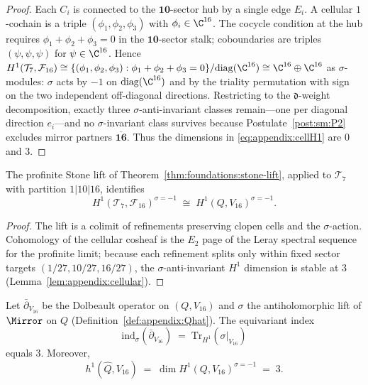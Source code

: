 \begin{proof}
Each $C_i$ is connected to the $\mathbf{10}$-sector hub by a single edge
$E_i$. A cellular $1$-cochain is a triple $(\phi_1,\phi_2,\phi_3)$ with
$\phi_i\in\C^{16}$. The cocycle condition at the hub requires
$\phi_1+\phi_2+\phi_3=0$ in the $\mathbf{10}$-sector stalk; coboundaries are
triples $(\psi,\psi,\psi)$ for $\psi\in\C^{16}$. Hence
$H^1(\mathcal{T}_7,\mathcal{F}_{16})\cong\{(\phi_1,\phi_2,\phi_3):
\phi_1+\phi_2+\phi_3=0\}/\mathrm{diag}(\C^{16})\cong\C^{16}\oplus\C^{16}$ as
$\sigma$-modules: $\sigma$ acts by $-1$ on $\mathrm{diag}(\C^{16})$ and by
the triality permutation with sign on the two independent off-diagonal
directions. Restricting to the $\mathfrak{d}$-weight decomposition, exactly
three $\sigma$-anti-invariant classes remain---one per diagonal direction
$e_i$---and no $\sigma$-invariant class survives because Postulate~\ref{post:sm:P2}
excludes mirror partners $\overline{\mathbf{16}}$. Thus the dimensions in
\eqref{eq:appendix:cellH1} are $0$ and $3$.
\end{proof}

\begin{proposition}\label{prop:appendix:stone-lift}
The profinite Stone lift of Theorem~\ref{thm:foundations:stone-lift}, applied
to $\mathcal{T}_7$ with partition $1|10|16$, identifies
\begin{equation}\label{eq:appendix:lift}
  H^1(\mathcal{T}_7,\mathcal{F}_{16})^{\sigma=-1}
  \;\cong\;
  H^1(Q,V_{16})^{\sigma=-1}.
\end{equation}
\end{proposition}

\begin{proof}
The lift is a colimit of refinements preserving clopen cells and the
$\sigma$-action. Cohomology of the cellular cosheaf is the $E_2$ page of the
Leray spectral sequence for the profinite limit; because each refinement
splits only within fixed sector targets $(1/27,10/27,16/27)$, the
$\sigma$-anti-invariant $H^1$ dimension is stable at $3$
(Lemma~\ref{lem:appendix:cellular}).
\end{proof}

\begin{theorem}\label{thm:appendix:mirror-index}
Let $\bar\partial_{V_{16}}$ be the Dolbeault operator on $(Q,V_{16})$ and
$\sigma$ the antiholomorphic lift of $\Mirror$ on $Q$
(Definition~\ref{def:appendix:Qhat}). The equivariant index
\begin{equation}\label{eq:appendix:index}
  \mathrm{ind}_\sigma(\bar\partial_{V_{16}})
  \;=\;
  \mathrm{Tr}_{H^1}(\sigma|_{V_{16}})
\end{equation}
equals $3$. Moreover,
\begin{equation}\label{eq:appendix:h1}
  h^1(\hat Q,V_{16})
  \;=\;
  \dim H^1(Q,V_{16})^{\sigma=-1}
  \;=\; 3.
\end{equation}
\end{theorem}

